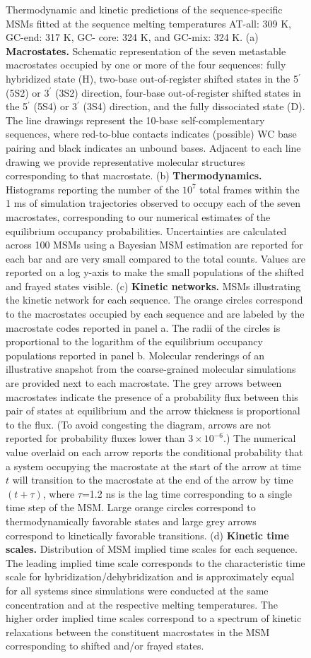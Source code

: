 \documentclass[journal=jpcbfk,manuscript=article]{achemso}
\newcommand*{\rood}[1]{{#1}}
\begin{document}
\begin{figure}[ht!]
        \caption{Thermodynamic and kinetic predictions of the sequence-specific MSMs \rood{fitted at the sequence melting temperatures AT-all: 309 K, GC-end: 317 K, GC- core: 324 K, and GC-mix: 324 K}. (a) \textbf{Macrostates.} Schematic representation of the seven metastable macrostates occupied by one or more of the four sequences: fully hybridized state (H), two-base out-of-register shifted states in the 5$^\prime$ (5S2) or 3$^\prime$ (3S2) direction, four-base out-of-register shifted states in the 5$^\prime$ (5S4) or 3$^\prime$ (3S4) direction, and the fully dissociated state (D). The line drawings represent the 10-base self-complementary sequences, where red-to-blue contacts indicates (possible) WC base pairing and black indicates an unbound bases. Adjacent to each line drawing we provide representative molecular structures corresponding to that macrostate. (b) \textbf{Thermodynamics.} Histograms reporting the number of the $10^7$ total frames within the 1 ms of simulation trajectories observed to occupy each of the seven macrostates, corresponding to our numerical estimates of the equilibrium occupancy probabilities. Uncertainties are calculated across 100 MSMs using a Bayesian MSM estimation are reported for each bar and are very small compared to the total counts. \rood{Values are reported on a log y-axis to make the small populations of the shifted and frayed states visible.} (c) \textbf{Kinetic networks.} MSMs illustrating the kinetic network for each sequence. The orange circles correspond to the macrostates occupied by each sequence and are labeled by the macrostate codes reported in panel a. The radii of the circles is proportional to the logarithm of the equilibrium occupancy populations reported in panel b. Molecular renderings of an illustrative snapshot from the coarse-grained molecular simulations are provided next to each macrostate. The grey arrows between macrostates indicate the presence of a probability flux between this pair of states at equilibrium and the arrow thickness is proportional to the flux. (To avoid congesting the diagram, arrows are not reported for probability fluxes lower than $3\times10^{-6}$.) The numerical value overlaid on each arrow reports the conditional probability that a system occupying the macrostate at the start of the arrow at time $t$ will transition to the macrostate at the end of the arrow by time $(t+\tau)$, where $\tau$=1.2 ns is the lag time corresponding to a single time step of the MSM. Large orange circles correspond to thermodynamically favorable states and large grey arrows correspond to kinetically favorable transitions. (d) \textbf{Kinetic time scales.} Distribution of MSM implied time scales for each sequence. The leading implied time scale corresponds to the characteristic time scale for hybridization/dehybridization and is approximately equal for all systems since simulations were conducted at the same concentration and at the respective melting temperatures. The higher order implied time scales correspond to a spectrum of kinetic relaxations between the constituent macrostates in the MSM corresponding to shifted and/or frayed states.
    }
    \label{fig:allseq_table}
\end{figure}
\end{document}
